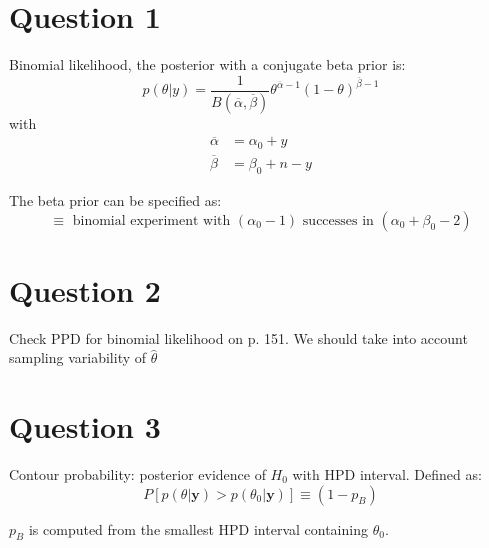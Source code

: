 \documentclass[11pt]{article}
\author{Marc-André Chénier}
\date{\today}
\title{}
\begin{document}
\tableofcontents

\section{Question 1}
\label{sec:org951c1ab}
Binomial likelihood, the posterior with a conjugate beta prior is:
\begin{equation}
p(\theta | y)=\frac{1}{B(\overline{\alpha}, \overline{\beta})} 
\theta^{\overline{\alpha}-1}(1-\theta)^{\overline{\beta}-1}
\end{equation}
with 
\begin{equation}
\begin{aligned} \overline{\alpha} &=\alpha_{0}+y \\ 
\overline{\beta} &=\beta_{0}+n-y \end{aligned}
\end{equation}

The beta prior can be specified as:
\begin{equation}
\equiv \text { binomial experiment with }\left(\alpha_{0}-1\right) 
\text { successes in }\left(\alpha_{0}+\beta_{0}-2\right)
\end{equation}

\section{Question 2}
\label{sec:org6c89be1}
Check PPD for binomial likelihood on p. 151. We should take into
account sampling variability of \(\hat{\theta}\)

\section{Question 3}
\label{sec:org4c7df3f}
Contour probability: posterior evidence of \(H_{0}\) with HPD interval.
Defined as:
\begin{equation}
P\left[p(\theta | \boldsymbol{y})>p\left(\theta_{0} | 
\boldsymbol{y}\right)\right] \equiv\left(1-p_{B}\right)
\end{equation}

\(p_{B}\) is computed from the smallest HPD interval containing
\(\theta_{0}\). 
\end{document}
